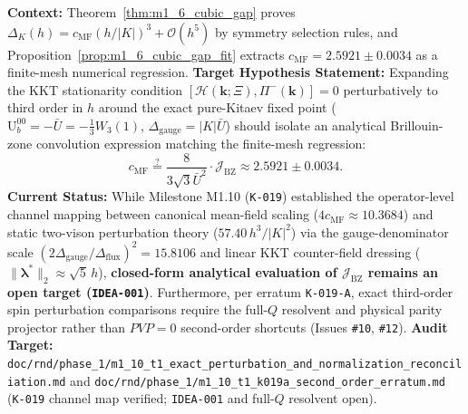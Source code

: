 \begin{contract}
\label{con:h6_analytical_cubic_prefactor}
\textbf{Context:} Theorem~\ref{thm:m1_6_cubic_gap} proves $\Delta_K(h) = c_{\mathrm{MF}} (h/|K|)^3 + \mathcal{O}(h^5)$ by symmetry selection rules, and Proposition~\ref{prop:m1_6_cubic_gap_fit} extracts $c_{\mathrm{MF}} = 2.5921 \pm 0.0034$ as a finite-mesh numerical regression.
\textbf{Target Hypothesis Statement:} Expanding the KKT stationarity condition $[\mathcal{H}(\mathbf{k}; \Xi), \Pi^-(\mathbf{k})] = 0$ perturbatively to third order in $h$ around the exact pure-Kitaev fixed point ($\mathrm{U}_b^{00} = -\bar{U} = -\frac{1}{3}W_3(1)$, $\Delta_{\mathrm{gauge}} = |K|\bar{U}$) should isolate an analytical Brillouin-zone convolution expression matching the finite-mesh regression:
\begin{equation}
\label{eq:con_h6_analytic_c}
c_{\mathrm{MF}} \stackrel{?}{=} \frac{8}{3\sqrt{3} \bar{U}^2} \cdot \mathcal{J}_{\mathrm{BZ}} \approx 2.5921 \pm 0.0034.
\end{equation}
\textbf{Current Status:} While Milestone M1.10 (\texttt{K-019}) established the operator-level channel mapping between canonical mean-field scaling ($4 c_{\mathrm{MF}} \approx 10.3684$) and static two-vison perturbation theory ($57.40\, h^3/|K|^2$) via the gauge-denominator scale $(2\Delta_{\mathrm{gauge}}/\Delta_{\mathrm{flux}})^2 = 15.8106$ and linear KKT counter-field dressing ($\|\boldsymbol{\lambda}^*\|_2 \approx \sqrt{5}\,h$), \textbf{closed-form analytical evaluation of $\mathcal{J}_{\mathrm{BZ}}$ remains an open target (\texttt{IDEA-001})}. Furthermore, per erratum \texttt{K-019-A}, exact third-order spin perturbation comparisons require the full-$Q$ resolvent and physical parity projector rather than $PVP=0$ second-order shortcuts (Issues \texttt{\#10}, \texttt{\#12}).
\textbf{Audit Target:} \texttt{doc/rnd/phase\_1/m1\_10\_t1\_exact\_perturbation\_and\_normalization\_reconciliation.md} and \texttt{doc/rnd/phase\_1/m1\_10\_t1\_k019a\_second\_order\_erratum.md} (\texttt{K-019} channel map verified; \texttt{IDEA-001} and full-$Q$ resolvent open).
\end{contract}

